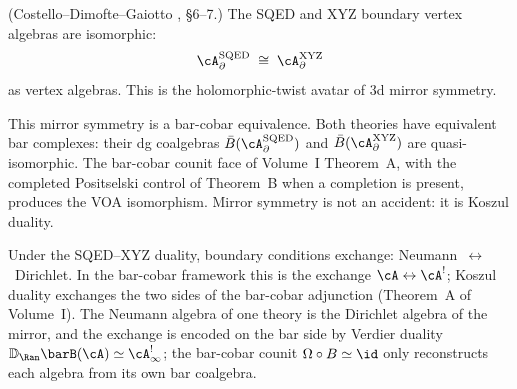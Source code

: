 \begin{theorem}
\label{thm:sqed-xyz-mirror}
\textup{(Costello--Dimofte--Gaiotto \cite{CDG2023}, \S6--7.)}
The SQED and XYZ boundary vertex algebras are isomorphic:
\[
 \cA_{\partial}^{\mathrm{SQED}}
 \;\cong\;
 \cA_{\partial}^{\mathrm{XYZ}}
\]
as vertex algebras. This is the holomorphic-twist avatar of $3$d
mirror symmetry.
\end{theorem}

\begin{remark}
\label{rem:mirror-as-koszul}
This mirror symmetry is a bar-cobar equivalence. Both theories
have equivalent bar complexes: their dg coalgebras
$\bar{B}(\cA_{\partial}^{\mathrm{SQED}})$ and
$\bar{B}(\cA_{\partial}^{\mathrm{XYZ}})$ are quasi-isomorphic. The
bar-cobar counit face of Volume~I Theorem~A, with the completed
Positselski control of Theorem~B when a completion is present, produces
the VOA isomorphism. Mirror symmetry is not an accident: it is Koszul
duality.
\end{remark}

\begin{remark}
\label{rem:mirror-bc-exchange}
Under the SQED--XYZ duality, boundary conditions exchange:
Neumann~$\leftrightarrow$~Dirichlet. In the bar-cobar framework
this is the exchange $\cA \leftrightarrow \cA^!$; Koszul duality
exchanges the two sides of the bar-cobar adjunction
(Theorem~A of Volume~I). The Neumann algebra of one theory is the
Dirichlet algebra of the mirror, and the exchange is encoded on
the bar side by Verdier duality
$\mathbb{D}_{\Ran}\barB(\cA)\simeq \cA^!_\infty$; the
bar-cobar counit $\Omega \circ B \simeq \id$ only reconstructs
each algebra from its own bar coalgebra.
\end{remark}

